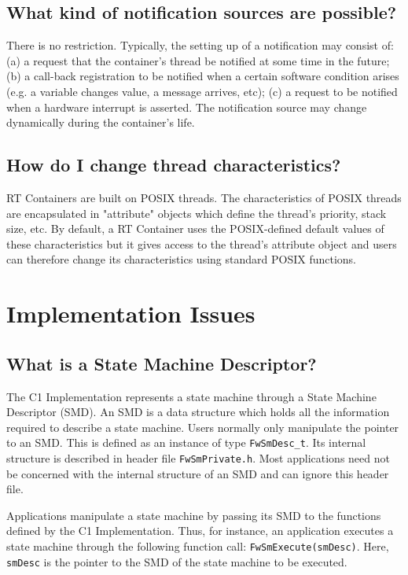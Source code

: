 \documentclass[a4paper,10pt]{article}
\let\stdsection\section
\renewcommand\section{\newpage\stdsection}
\begin{document}
\subsection{What kind of notification sources are possible?}
There is no restriction. Typically, the setting up of a notification may consist of: (a) a request that the container's thread be notified at some time in the future; (b) a
call-back registration to be notified when a certain software condition arises (e.g. a variable changes value, a message arrives, etc); (c) a request to be notified when a hardware interrupt is asserted. The notification source may change dynamically during the container's life.

\subsection{How do I change thread characteristics?}
RT Containers are built on POSIX threads. The characteristics of POSIX threads are encapsulated in "attribute" objects which define the thread's priority, stack size, etc. By default, a RT Container uses the POSIX-defined default values of these characteristics but it gives access to the thread's attribute object and users can therefore change its characteristics using standard POSIX functions. 


\section{Implementation Issues}

\subsection{What is a State Machine Descriptor?}\label{faq:SMD}
The C1 Implementation represents a state machine through a State Machine Descriptor (SMD). An SMD is a data structure which holds all the information 
required to describe a state machine. Users normally only manipulate the pointer to an SMD. This is defined as an instance of type \texttt{FwSmDesc\_t}. Its internal structure is described in header file \texttt{FwSmPrivate.h}. Most applications need not be concerned with the internal structure of an SMD and can ignore this header file.

Applications manipulate a state machine by passing its SMD to the functions defined by the C1 Implementation. Thus, for instance, an application executes 
a state machine through the following function call: \texttt{FwSmExecute(smDesc)}. Here, \texttt{smDesc} is the pointer to the SMD of the state machine to be executed.
\end{document}
